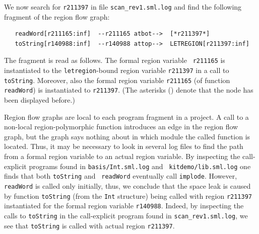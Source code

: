 \documentclass[12pt]{book}
\begin{document}
We now search for \texttt{r211397} in file \texttt{scan\_rev1.sml.log} and
find the following fragment of the region flow graph:
\begin{small}
\begin{verbatim}
   readWord[r211165:inf]  --r211165 atbot-->  [*r211397*]
   toString[r140988:inf]  --r140988 attop-->  LETREGION[r211397:inf]
\end{verbatim}
\end{small}
The fragment is read as follows. The formal region variable {\tt
  r211165} is instantiated to the {\tt letregion}-bound region variable
{\tt r211397} in a call to {\tt toString}. Moreover, also the formal
region variable {\tt r211165} (of function {\tt readWord}) is
instantiated to {\tt r211397}. (The asterisks ({\tt *}) denote that the
node has been displayed before.)

Region flow graphs are local to each program fragment in a project. A
call to a non-local region-polymorphic function introduces an edge in
the region flow graph, but the graph says nothing about in which
module the called function is located. Thus, it may be necessary to
look in several log files to find the path from a formal region
variable to an actual region variable. By inspecting the call-explicit
programs found in {\tt basis/Int.sml.log} and {\tt
  kitdemo/lib.sml.log} one finds that both {\tt toString} and {\tt
  readWord} eventually call {\tt implode}. However, {\tt readWord} is
called only initially, thus, we conclude that the space leak is caused
by function {\tt toString} (from the {\tt Int} structure) being called
with region {\tt r211397} instantiated for the formal region variable
{\tt r140988}. Indeed, by inspecting the calls to {\tt toString} in the
call-explicit program found in {\tt scan\_rev1.sml.log}, we see that
{\tt toString} is called with actual region {\tt r211397}.
\end{document}
